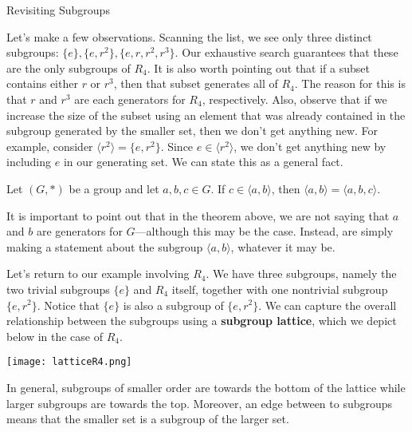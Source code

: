 \begin{section}{Revisiting Subgroups}
\begin{multicols}{2}
\end{multicols}
Let's make a few observations.  Scanning the list, we see only three distinct subgroups: \(\{e\}, \{e,r^2\},\{e,r,r^2,r^3\}\).  Our exhaustive search guarantees that these are the only subgroups of \(R_4\).  It is also worth pointing out that if a subset contains either \(r\) or \(r^3\), then that subset generates all of \(R_4\).  The reason for this is that \(r\) and \(r^3\) are each generators for \(R_4\), respectively.  Also, observe that if we increase the size of the subset using an element that was already contained in the subgroup generated by the smaller set, then we don't get anything new.  For example, consider \(\langle r^2\rangle=\{e,r^2\}\).  Since \(e\in\langle r^2\rangle\), we don't get anything new by including \(e\) in our generating set.  We can state this as a general fact.

\begin{theorem}
Let \((G,*)\) be a group and let \(a,b,c\in G\).  If \(c\in\langle a,b\rangle\), then \(\langle a,b\rangle = \langle a,b,c\rangle\).
\end{theorem}

It is important to point out that in the theorem above, we are not saying that \(a\) and \(b\) are generators for \(G\)---although this may be the case.  Instead, are simply making a statement about the subgroup \(\langle a,b\rangle\), whatever it may be.

Let's return to our example involving \(R_4\).  We have three subgroups, namely the two trivial subgroups \(\{e\}\) and \(R_4\) itself, together with one nontrivial subgroup \(\{e,r^2\}\).  Notice that \(\{e\}\) is also a subgroup of \(\{e,r^2\}\).  We can capture the overall relationship between the subgroups using a \textbf{subgroup lattice}, which we depict below in the case of \(R_4\).

\begin{center}
\texttt{[image: latticeR4.png]}
\end{center}

In general, subgroups of smaller order are towards the bottom of the lattice while larger subgroups are towards the top.  Moreover, an edge between to subgroups means that the smaller set is a subgroup of the larger set.


\end{section}
